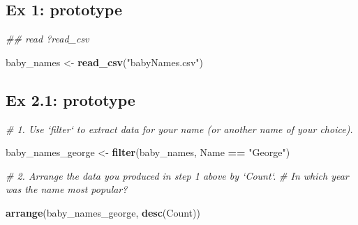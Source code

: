 \documentclass[]{book}
\newenvironment{Shaded}{\begin{snugshade}}{\end{snugshade}}
\newcommand{\CommentTok}[1]{\textcolor[rgb]{0.56,0.35,0.01}{\textit{#1}}}
\newcommand{\KeywordTok}[1]{\textcolor[rgb]{0.13,0.29,0.53}{\textbf{#1}}}
\newcommand{\NormalTok}[1]{#1}
\newcommand{\OperatorTok}[1]{\textcolor[rgb]{0.81,0.36,0.00}{\textbf{#1}}}
\newcommand{\StringTok}[1]{\textcolor[rgb]{0.31,0.60,0.02}{#1}}
\begin{document}
\hypertarget{ex-1-prototype}{%
\subsection{Ex 1: prototype}\label{ex-1-prototype}}

\begin{Shaded}
\begin{Highlighting}[]
\CommentTok{## read ?read_csv}
\end{Highlighting}
\end{Shaded}

\begin{Shaded}
\begin{Highlighting}[]
\NormalTok{baby_names <-}\StringTok{ }\KeywordTok{read_csv}\NormalTok{(}\StringTok{"babyNames.csv"}\NormalTok{)}
\end{Highlighting}
\end{Shaded}

\hypertarget{ex-2.1-prototype}{%
\subsection{Ex 2.1: prototype}\label{ex-2.1-prototype}}

\begin{Shaded}
\begin{Highlighting}[]
\CommentTok{# 1.  Use `filter` to extract data for your name (or another name of your choice).  }
\end{Highlighting}
\end{Shaded}

\begin{Shaded}
\begin{Highlighting}[]
\NormalTok{baby_names_george <-}\StringTok{ }\KeywordTok{filter}\NormalTok{(baby_names, Name }\OperatorTok{==}\StringTok{ "George"}\NormalTok{)}
\end{Highlighting}
\end{Shaded}

\begin{Shaded}
\begin{Highlighting}[]
\CommentTok{# 2.  Arrange the data you produced in step 1 above by `Count`. }
\CommentTok{#     In which year was the name most popular?}
\end{Highlighting}
\end{Shaded}

\begin{Shaded}
\begin{Highlighting}[]
\KeywordTok{arrange}\NormalTok{(baby_names_george, }\KeywordTok{desc}\NormalTok{(Count))}
\end{Highlighting}
\end{Shaded}
\end{document}
